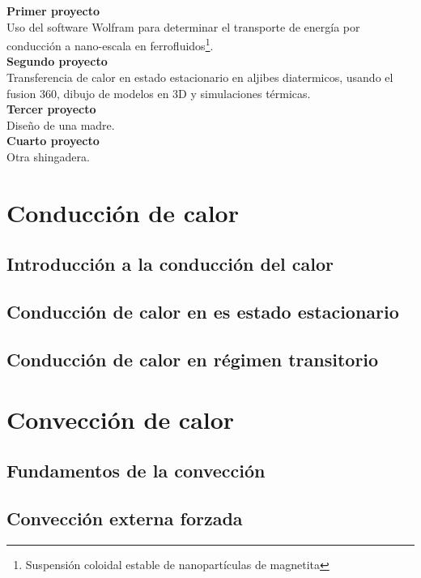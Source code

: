 \documentclass[11pt]{report}
\theoremstyle{plain}
\theoremstyle{definition}
\begin{document}
\textbf{Primer proyecto}\\
Uso del software Wolfram para determinar el transporte de energía por conducción a nano-escala en ferrofluidos\footnote{Suspensión coloidal estable de nanopartículas de magnetita}.\\


\textbf{Segundo proyecto}\\
Transferencia de calor en estado estacionario en aljibes diatermicos, usando el fusion 360, dibujo de modelos en 3D y simulaciones térmicas.\\


\textbf{Tercer proyecto}\\
Diseño de una madre.\\


\textbf{Cuarto proyecto}\\
Otra shingadera.\\


\chapter{Conducción de calor}
\section{Introducción a la conducción del calor}
\section{Conducción de calor en es estado estacionario}
\section{Conducción de calor en régimen transitorio}


\chapter{Convección de calor}
\section{Fundamentos de la convección}
\section{Convección externa forzada}
\end{document}
